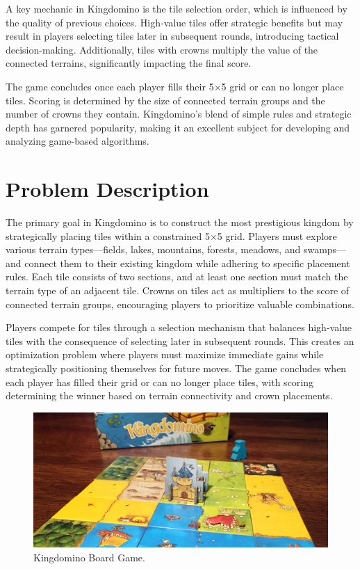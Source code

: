 \documentclass[conference]{IEEEtran}
\begin{document}
A key mechanic in Kingdomino is the tile selection order, which is influenced
by the quality of previous choices. High-value tiles offer strategic benefits
but may result in players selecting tiles later in subsequent rounds,
introducing tactical decision-making. Additionally, tiles with crowns multiply
the value of the connected terrains, significantly impacting the final score.

The game concludes once each player fills their 5$\times$5 grid or can no
longer place tiles. Scoring is determined by the size of connected terrain
groups and the number of crowns they contain. Kingdomino's blend of simple
rules and strategic depth has garnered popularity, making it an excellent
subject for developing and analyzing game-based algorithms.

\section{Problem Description}

The primary goal in Kingdomino is to construct the most prestigious kingdom by
strategically placing tiles within a constrained 5$\times$5 grid. Players must
explore various terrain types—fields, lakes, mountains, forests, meadows, and
swamps—and connect them to their existing kingdom while adhering to specific
placement rules. Each tile consists of two sections, and at least one section
must match the terrain type of an adjacent tile. Crowns on tiles act as
multipliers to the score of connected terrain groups, encouraging players to
prioritize valuable combinations.

Players compete for tiles through a selection mechanism that balances
high-value tiles with the consequence of selecting later in subsequent rounds.
This creates an optimization problem where players must maximize immediate
gains while strategically positioning themselves for future moves. The game
concludes when each player has filled their grid or can no longer place tiles,
with scoring determining the winner based on terrain connectivity and crown
placements.

\begin{figure}[htbp]
    \centerline{\includegraphics[width=\textwidth]{assets/kingdomino.jpg}}
    \caption{Kingdomino Board Game.}\label{fig:kingdomino}
\end{figure}
\end{document}
